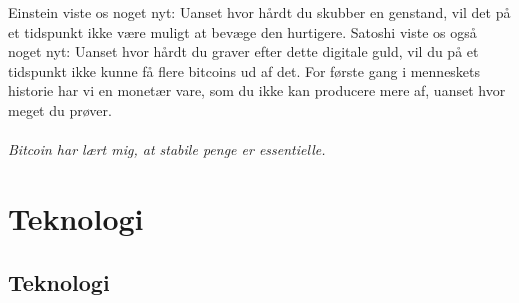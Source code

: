 \documentclass[paper=6in:9in,pagesize=pdftex,headinclude=on,footinclude=on,12pt]{scrbook}
\begin{document}
Einstein viste os noget nyt: Uanset hvor hårdt du skubber en genstand, vil det på et tidspunkt ikke være muligt at bevæge den hurtigere. Satoshi viste os også noget nyt: Uanset hvor hårdt du graver efter dette digitale guld, vil du på et tidspunkt ikke kunne få flere bitcoins ud af det. For første gang i menneskets historie har vi en monetær vare, som du ikke kan producere mere af, uanset hvor meget du prøver.\paragraph{Bitcoin har lært mig, at stabile penge er essentielle.}%
%
%
%
%
%
%
%
%

\part{Teknologi}
\label{ch:technology}
\chapter*{Teknologi}
\end{document}
